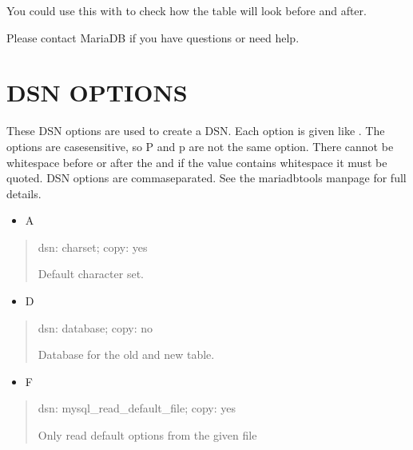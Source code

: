 \documentclass[letterpaper,10pt,english]{sphinxmanual}
\begin{document}
\sphinxAtStartPar
You could use this with {\hyperref[\detokenize{mariadb-schema-change:cmdoption-mariadb-schema-change-dry-run}]{}} to check how the table will look before and after.

\sphinxAtStartPar
Please contact MariaDB if you have questions or need help.


\section{DSN OPTIONS}
\label{\detokenize{mariadb-schema-change:dsn-options}}
\sphinxAtStartPar
These DSN options are used to create a DSN.  Each option is given like
.  The options are case\sphinxhyphen{}sensitive, so P and p are not the
same option.  There cannot be whitespace before or after the \sphinxcode{\sphinxupquote{=}} and
if the value contains whitespace it must be quoted.  DSN options are
comma\sphinxhyphen{}separated.  See the mariadb\sphinxhyphen{}tools manpage for full details.
\begin{itemize}
\item {} 
\sphinxAtStartPar
A

\end{itemize}
\begin{quote}

\sphinxAtStartPar
dsn: charset; copy: yes

\sphinxAtStartPar
Default character set.
\end{quote}
\begin{itemize}
\item {} 
\sphinxAtStartPar
D

\end{itemize}
\begin{quote}

\sphinxAtStartPar
dsn: database; copy: no

\sphinxAtStartPar
Database for the old and new table.
\end{quote}
\begin{itemize}
\item {} 
\sphinxAtStartPar
F

\end{itemize}
\begin{quote}

\sphinxAtStartPar
dsn: mysql\_read\_default\_file; copy: yes

\sphinxAtStartPar
Only read default options from the given file
\end{quote}
\end{document}
